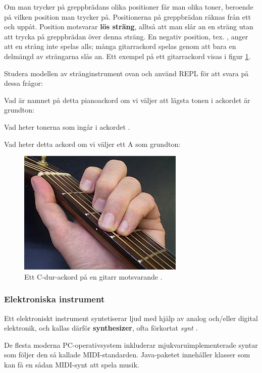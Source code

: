 {Om man trycker på greppbrädans olika positioner får man olika toner, beroende på vilken position man trycker på. Positionerna på greppbrädan räknas från ett och uppåt. Position  motsvarar \textbf{lös sträng}, alltså att man slår an en sträng utan att trycka på greppbrädan över denna sträng. En negativ position, tex. , anger att en sträng inte spelas alls; många gitarrackord spelas genom att bara en delmängd av strängarna slås an.
Ett exempel på ett gitarrackord  visas i figur \ref{music:fig:guitar-chord}.

\Task\Pen Studera modellen av stränginstrument ovan och använd REPL för att svara på dessa frågor:

\Subtask Vad är namnet på detta pianoackord om vi väljer att lägsta tonen i ackordet är grundton: 

\Subtask Vad heter tonerna som ingår i ackordet .

\Subtask Vad heter detta ackord om vi väljer ett A som grundton: 


\begin{figure}
  \centering
  \includegraphics{../img/chords/guitar-C-major-chord.jpg}
  \caption{Ett C-dur-ackord på en gitarr motsvarande .}
  \label{music:fig:guitar-chord}
\end{figure}


\subsubsection{Elektroniska instrument}

Ett elektroniskt instrument syntetiserar ljud med hjälp av analog och/eller digital elektronik, och kallas därför \textbf{synthesizer}, ofta förkortat \emph{synt} .

De flesta moderna PC-operativsystem inkluderar mjukvaruimplementerade syntar som följer den så kallade MIDI-standarden. Java-paketet  innehåller klasser som kan få en sådan MIDI-synt att spela musik.

}
